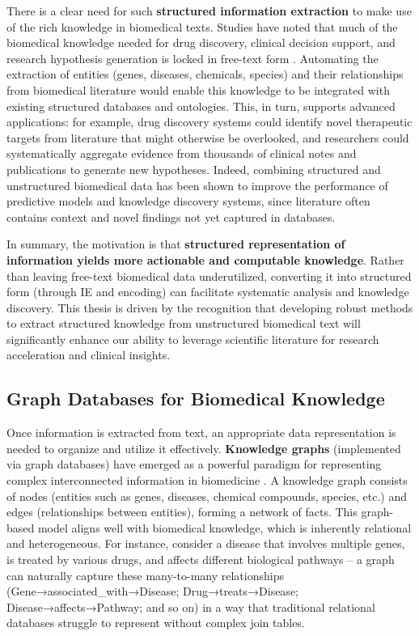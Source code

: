 There is a clear need for such \textbf{structured information extraction} to make use of the rich knowledge in biomedical texts. Studies have noted that much of the biomedical knowledge needed for drug discovery, clinical decision support, and research hypothesis generation is locked in free-text form \parencite{Liu2024}. Automating the extraction of entities (genes, diseases, chemicals, species) and their relationships from biomedical literature would enable this knowledge to be integrated with existing structured databases and ontologies. This, in turn, supports advanced applications: for example, drug discovery systems could identify novel therapeutic targets from literature that might otherwise be overlooked, and researchers could systematically aggregate evidence from thousands of clinical notes and publications to generate new hypotheses. Indeed, combining structured and unstructured biomedical data has been shown to improve the performance of predictive models and knowledge discovery systems, since literature often contains context and novel findings not yet captured in databases.

In summary, the motivation is that \textbf{structured representation of information yields more actionable and computable knowledge}. Rather than leaving free-text biomedical data underutilized, converting it into structured form (through IE and encoding) can facilitate systematic analysis and knowledge discovery. This thesis is driven by the recognition that developing robust methods to extract structured knowledge from unstructured biomedical text will significantly enhance our ability to leverage scientific literature for research acceleration and clinical insights.

\subsection{Graph Databases for Biomedical Knowledge}

Once information is extracted from text, an appropriate data representation is needed to organize and utilize it effectively. \textbf{Knowledge graphs} (implemented via graph databases) have emerged as a powerful paradigm for representing complex interconnected information in biomedicine \parencite{Milvus2025}. A knowledge graph consists of nodes (entities such as genes, diseases, chemical compounds, species, etc.) and edges (relationships between entities), forming a network of facts. This graph-based model aligns well with biomedical knowledge, which is inherently relational and heterogeneous. For instance, consider a disease that involves multiple genes, is treated by various drugs, and affects different biological pathways – a graph can naturally capture these many-to-many relationships (Gene→associated\_with→Disease; Drug→treats→Disease; Disease→affects→Pathway; and so on) in a way that traditional relational databases struggle to represent without complex join tables.

